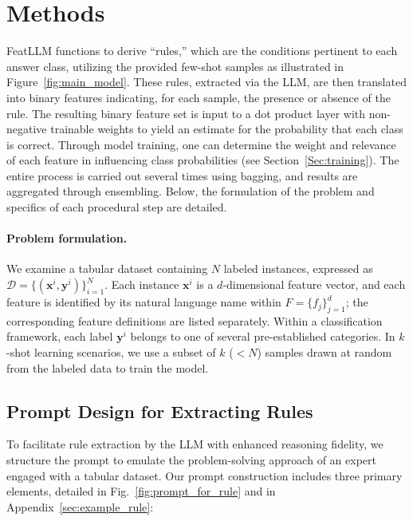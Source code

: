 \section{Methods}
\textsf{FeatLLM} functions to derive “rules,” which are the conditions pertinent to each answer class, utilizing the provided few-shot samples as illustrated in Figure~\ref{fig:main_model}. These rules, extracted via the LLM, are then translated into binary features indicating, for each sample, the presence or absence of the rule. The resulting binary feature set is input to a dot product layer with non-negative trainable weights to yield an estimate for the probability that each class is correct. Through model training, one can determine the weight and relevance of each feature in influencing class probabilities (see Section~\ref{Sec:training}). The entire process is carried out several times using bagging, and results are aggregated through ensembling. Below, the formulation of the problem and specifics of each procedural step are detailed.

\vspace*{-0.12in}
\paragraph{Problem formulation.} We examine a tabular dataset containing $N$ labeled instances, expressed as $\mathcal{D} = \{(\mathbf{x}^i, \mathbf{y}^i)\}_{i=1}^{N}$. Each instance $\mathbf{x}^i$ is a $d$-dimensional feature vector, and each feature is identified by its natural language name within $F = \{f_j\}_{j=1}^{d}$; the corresponding feature definitions are listed separately. Within a classification framework, each label $\mathbf{y}^i$ belongs to one of several pre-established categories. In $k$-shot learning scenarios, we use a subset of $k$ ($<N$) samples drawn at random from the labeled data to train the model.

\subsection{Prompt Design for Extracting Rules}
\label{Sec:prompt_design}
To facilitate rule extraction by the LLM with enhanced reasoning fidelity, we structure the prompt to emulate the problem-solving approach of an expert engaged with a tabular dataset. Our prompt construction includes three primary elements, detailed in Fig.~\ref{fig:prompt_for_rule} and in Appendix~\ref{sec:example_rule}:

\vspace*{-0.12in}
